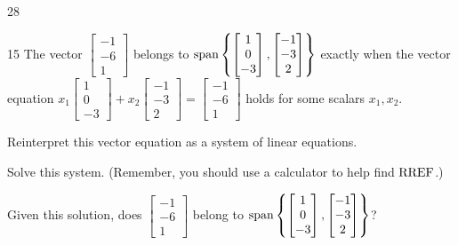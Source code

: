 \begin{applicationActivities}{2}{8}
\begin{activity}{15}
  The vector
  \(\begin{bmatrix}-1\\-6\\1\end{bmatrix}\) belongs to
  \(\vspan\left\{\begin{bmatrix}1\\0\\-3\end{bmatrix},
  \begin{bmatrix}-1\\-3\\2\end{bmatrix}\right\}\) exactly when
  the vector equation
  \(x_1\begin{bmatrix}1\\0\\-3\end{bmatrix}+
  x_2\begin{bmatrix}-1\\-3\\2\end{bmatrix}
  =\begin{bmatrix}-1\\-6\\1\end{bmatrix}\) holds for some scalars
  \(x_1,x_2\).
  \begin{subactivity}
    Reinterpret this vector equation as a system of linear equations.
  \end{subactivity}
  \begin{subactivity}
    Solve this system. (Remember, you should use a calculator to help
    find \(\RREF\).)
  \end{subactivity}
  \begin{subactivity}
    Given this solution, does
    \(\begin{bmatrix}-1\\-6\\1\end{bmatrix}\) belong to
    \(\vspan\left\{\begin{bmatrix}1\\0\\-3\end{bmatrix},
    \begin{bmatrix}-1\\-3\\2\end{bmatrix}\right\}\)?
  \end{subactivity}
\end{activity}


\end{applicationActivities}
